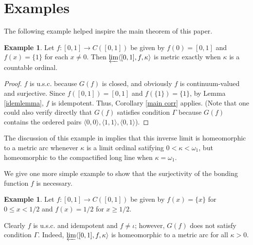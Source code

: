 \documentclass{amsart}
\theoremstyle{definition}
\newtheorem{example}[theorem]{Example}
\newcommand{\<}{\langle}
\renewcommand{\>}{\rangle}
\begin{document}
\section{Examples}

The following example helped inspire the main theorem of this paper.

\begin{example} \label{ex1} Let $f: [0,1] \rightarrow C([0,1])$ be given by $f(0) = [0,1]$ and $f(x) = \{1\}$ for each $x \ne 0$. Then $\varprojlim \langle [0,1], f, \kappa \rangle$ is metric exactly when $\kappa$ is a countable ordinal.
\end{example}

\begin{proof} $f$ is u.s.c. because $G(f)$ is closed, and obviously $f$ is continuum-valued and surjective. Since $f([0,1]) = [0,1]$ and $f(\{1\}) = \{1\}$, by Lemma \ref{idemlemma}, $f$ is idempotent. Thus, Corollary \ref{main corr} applies. (Note that one could also verify directly that $G(f)$ satisfies condition $\Gamma$ because $G(f)$ contains the ordered pairs $\langle 0,0 \rangle, \langle 1,1 \rangle, \langle 0,1 \rangle$).
\end{proof}

The discussion of this example in \cite{varagona} implies that this inverse limit is homeomorphic to a metric arc whenever $\kappa$ is a limit ordinal satifying $0 < \kappa < \omega_1$, but homeomorphic to the compactified long line when $\kappa = \omega_1$.
\

We give one more simple example to show that the surjectivity of the bonding function $f$ is necessary.

\begin{example} \label{ex2} Let $f: [0,1] \rightarrow C([0,1])$ be given by $f(x) = \{x\}$ for $0 \le x < 1/2$ and $f(x) = 1/2$ for $x \ge 1/2$.
\end{example}

Clearly $f$ is u.s.c. and idempotent and $f \ne \iota$; however, $G(f)$ does not satisfy condition $\Gamma$. Indeed, $\varprojlim \langle [0,1], f, \kappa \rangle$ is homeomorphic to a metric arc for all $\kappa > 0$.
\end{document}
